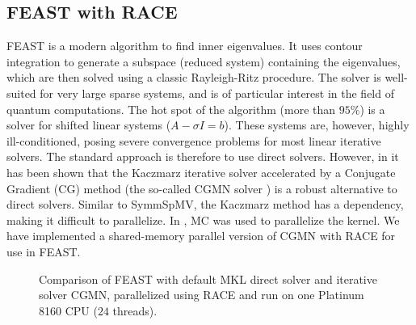\subsection{FEAST with RACE}
FEAST\cite{FEAST} is a modern algorithm to find inner eigenvalues.
It uses contour integration to generate a subspace (reduced system) containing the eigenvalues,
which are then solved using a classic Rayleigh-Ritz procedure. The solver is
well-suited for very large sparse systems, and is of particular interest in the field
of quantum computations.
 The hot spot of the algorithm (more than $95\%$) is a solver for
 shifted linear systems ($A- \sigma I = b$). These systems are, however, highly %
 ill-conditioned, posing severe convergence
 problems for most linear iterative solvers. The standard approach
 is therefore to use direct solvers. However, in \cite{feast_mc} it has been shown
 that the Kaczmarz iterative solver accelerated by a Conjugate Gradient (CG) method
 (the  so-called CGMN solver \cite{cgmn}) is a robust alternative to direct solvers. 
Similar to \acrshort{SymmSpMV}, the Kaczmarz method has a \DTWO dependency, making
it difficult to parallelize. In \cite{feast_mc}, \acrlong{MC} was used to
parallelize the kernel. We have implemented a shared-memory parallel version of CGMN with \acrshort{RACE} for use in FEAST.

\begin{figure}[b]
	\centering
	\scalebox{0.56}{}
	\caption{\label{fig:feast} Comparison of FEAST with default
          \acrshort{MKL} direct solver and iterative solver CGMN,
          parallelized using \acrshort{RACE} and run on
          one \SKX Platinum 8160 CPU ($24$ threads). }
\end{figure}

